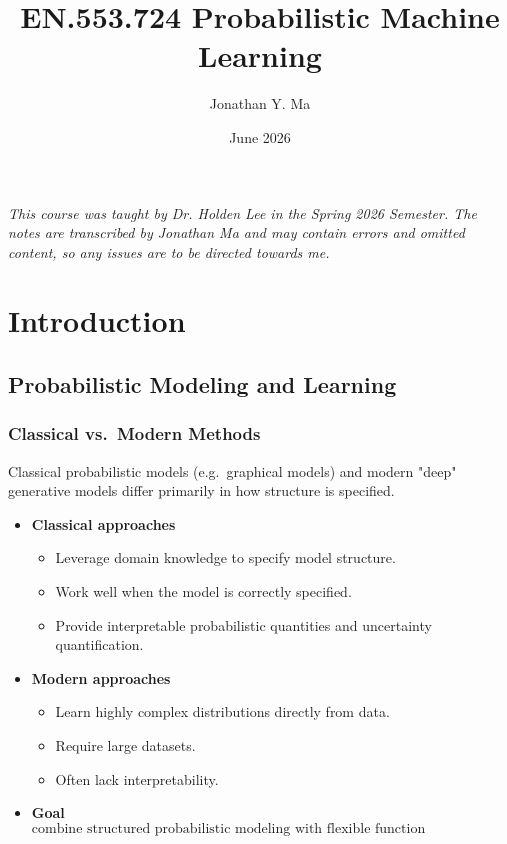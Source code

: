 \documentclass[12pt,oneside]{book}
\title{EN.553.724 Probabilistic Machine Learning}
\author{Jonathan Y. Ma}
\date{June 2026}
\numberwithin{equation}{section}
\theoremstyle{definition}
\theoremstyle{plain}
\theoremstyle{remark}
\begin{document}
\maketitle

\noindent \emph{This course was taught by Dr. Holden Lee in the Spring 2026 Semester. The notes are transcribed by Jonathan Ma and may contain errors and omitted content, so any issues are to be directed towards me.}

\tableofcontents

\newpage
\chapter{Introduction}

\section{Probabilistic Modeling and Learning}

\subsection{Classical vs.\ Modern Methods}

Classical probabilistic models (e.g.\ graphical models) and modern "deep" generative models differ primarily in how structure is specified.

\begin{itemize}
\item \textbf{Classical approaches} 
\begin{itemize}
\item Leverage domain knowledge to specify model structure.
\item Work well when the model is correctly specified.
\item Provide interpretable probabilistic quantities and uncertainty quantification.
\end{itemize}

\item \textbf{Modern approaches}
\begin{itemize}
\item Learn highly complex distributions directly from data.
\item Require large datasets.
\item Often lack interpretability.
\end{itemize}

\item \textbf{Goal}
\[
\text{combine structured probabilistic modeling with flexible function approximation.}
\]
\end{itemize}
\end{document}
